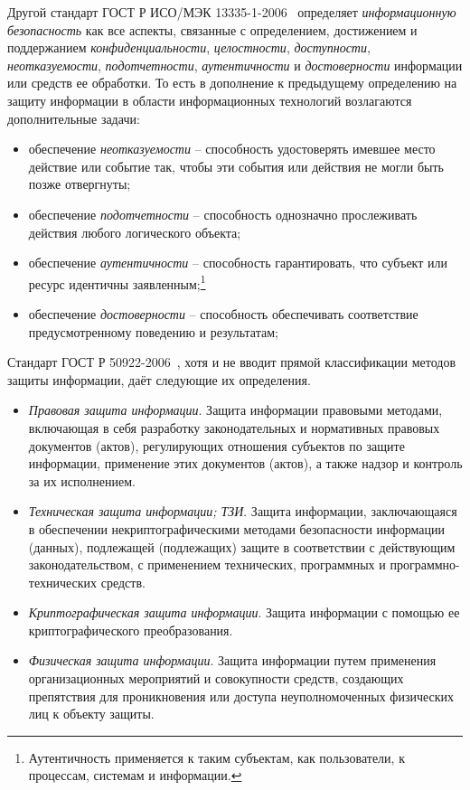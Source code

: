 Другой стандарт ГОСТ Р ИСО/МЭК 13335-1-2006~\cite{GOST-13335-1-2006} определяет \emph{информационную безопасность} как все аспекты, связанные с определением, достижением и поддержанием \emph{конфиденциальности}, \emph{целостности}, \emph{доступности}, \emph{неотказуемости}, \emph{подотчетности}, \emph{аутентичности} и \emph{достоверности} информации или средств ее обработки. То есть в дополнение к предыдущему определению на защиту информации в области информационных технологий возлагаются дополнительные задачи:
\begin{itemize}
	\item обеспечение \emph{неотказуемости} -- способность удостоверять имевшее место действие или событие так, чтобы эти события или действия не могли быть позже отвергнуты;
	\item обеспечение \emph{подотчетности} -- способность однозначно прослеживать действия любого логического объекта;
	\item обеспечение \emph{аутентичности} -- способность гарантировать, что субъект или ресурс идентичны заявленным;\footnote{Аутентичность применяется к таким субъектам, как пользователи, к процессам, системам и информации.}
	\item обеспечение \emph{достоверности} -- способность обеспечивать соответствие предусмотренному поведению и результатам;
\end{itemize}

Стандарт ГОСТ Р 50922-2006~\cite{GOST-50922-2006}, хотя и не вводит прямой классификации методов защиты информации, даёт следующие их определения.
\begin{itemize}
	\item \emph{Правовая защита информации}. Защита информации правовыми методами, включающая в себя разработку законодательных и нормативных правовых документов (актов), регулирующих отношения субъектов по защите информации, применение этих документов (актов), а также надзор и контроль за их исполнением.
	\item \emph{Техническая защита информации; ТЗИ}. Защита информации, заключающаяся в обеспечении некриптографическими методами безопасности информации (данных), подлежащей (подлежащих) защите в соответствии с действующим законодательством, с применением технических, программных и программно-технических средств.
	\item \emph{Криптографическая защита информации}. Защита информации с помощью ее криптографического преобразования.
	\item \emph{Физическая защита информации}. Защита информации путем применения организационных мероприятий и совокупности средств, создающих препятствия для проникновения или доступа неуполномоченных физических лиц к объекту защиты.
\end{itemize}

